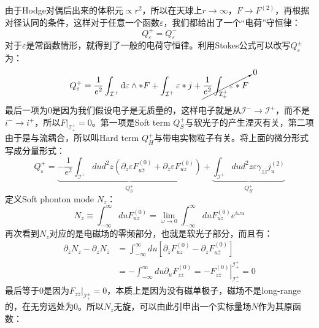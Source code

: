 由于Hodge对偶后出来的体积元$\propto r^2$，所以在天球上$r\to\infty$，$F\to F^{(2)}$，再根据对径认同的条件，这样对于任意一个函数$\varepsilon$，我们都给出了一个“电荷”守恒律：
\begin{equation}
	\boxed{
	Q_\varepsilon^+=Q_\varepsilon^-
	}
\end{equation}
对于$\varepsilon$是常函数情形，就得到了一般的电荷守恒律。利用Stokes公式可以改写$Q_\varepsilon^{\pm}$为：
\begin{equation}
	Q_\varepsilon^+=\frac{1}{e^2}\int_{\mathcal{I}^+}\mathrm{d}\varepsilon\wedge*F+\int_{\mathcal{I}^+}\varepsilon*j+\cancelto{0}{\frac{1}{e^2}\int_{\mathcal{I}_+^+}\varepsilon*F}
\end{equation}
最后一项为0是因为我们假设电子是无质量的，这样电子就是从$\mathcal{I}^-\to\mathcal{I}^+$，而不是$i^{-}\to i^+$，所以$F|_{\mathcal{I}_+^{+}}=0$。第一项是Soft term $Q_S^+$与软光子的产生湮灭有关，第二项由于是与流耦合，所以叫Hard term $Q_H^+$与带电实物粒子有关。将上面的微分形式写成分量形式：
\begin{equation}
	Q_{\varepsilon}^{+}=\underbrace{-\frac{1}{e^{2}}\int_{\mathcal{I}^{+}}dud^{2}z\left(\partial_{z}\varepsilon F_{u\bar{z}}^{(0)}+\partial_{\bar{z}}\varepsilon F_{uz}^{(0)}\right)}_{Q_{S}^{+}}+\underbrace{\int_{\mathcal{I}^{+}}dud^{2}z\varepsilon\gamma_{z\bar{z}}j_{u}^{(2)}}_{Q_{H}^{+}}
\end{equation}
定义Soft phonton mode $N_z$：
\begin{equation}
	N_{z}\equiv \int_{-\infty}^{\infty}duF_{uz}^{(0)}=\lim_{\omega\to0}\int_{-\infty}^{\infty}duF_{uz}^{(0)}e^{i\omega u}
\end{equation}
再次看到$N_z$对应的是电磁场的零频部分，也就是软光子部分，而且有：
\begin{equation}
	\begin{aligned}
		\partial_{\bar{z}}N_{z}-\partial_{z}N_{\bar{z}}& =\int_{-\infty}^{\infty}du\left[\partial_{\bar{z}}F_{uz}^{(0)}-\partial_{z}F_{u\bar{z}}^{(0)}\right]  \\
		&=-\int_{-\infty}^{\infty}du\left.\partial_{u}F_{z\bar{z}}^{(0)}=-F_{z\bar{z}}^{(0)}\right|_{\mathcal{I}_{-}^{+}}^{\mathcal{I}_{+}^{+}}=0
	\end{aligned}
\end{equation}
最后等于0是因为$F_{z\bar z}|_{\mathcal{I}_{+}^{\pm}}=0$，本质上是因为没有磁单极子，磁场不是long-range的，在无穷远处为0。所以$N_z$无旋，可以由此引申出一个实标量场$N$作为其原函数：
